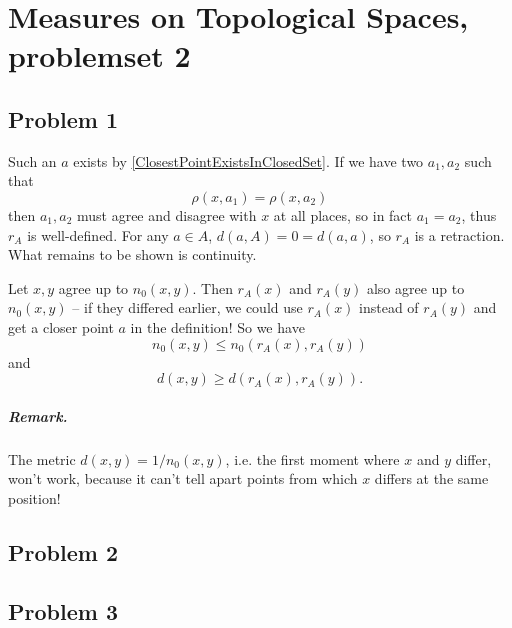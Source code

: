 \chapter{Measures on Topological Spaces, problemset 2}

\section*{Problem 1}

Such an \( a \) exists by \ref{ClosestPointExistsInClosedSet}. If we have two \( a_1, a_2 \) such that 
\[ 
    \rho(x, a_1) = \rho(x, a_2) 
\]
then \( a_1, a_2 \) must agree and disagree with \( x \) at all places, so in fact \( a_1 = a_2 \), thus \( r_A \) is well-defined. For any \( a \in A \), \( d(a,A) = 0 = d(a,a) \), so \( r_A \) is a retraction. What remains to be shown is continuity.

Let \( x, y \) agree up to \( n_0(x,y) \). Then \( r_A(x) \) and \( r_A(y) \) also agree up to \( n_0(x,y) \) -- if they differed earlier, we could use \( r_A(x) \) instead of \( r_A(y) \) and get a closer point \( a \) in the definition! So we have
\[ 
    n_0(x, y) \leqslant n_0 \left( r_A(x), r_A(y) \right) 
\]
and
\[ 
    d(x,y) \geqslant d \left(  r_A(x), r_A(y) \right).
\]

\paragraph{Remark.} The metric \( d(x,y) = 1/n_0(x,y) \), i.e. the first moment where \( x \) and \( y \) differ, won't work, because it can't tell apart points from which \( x \) differs at the same position!

\section*{Problem 2}

\section*{Problem 3}

